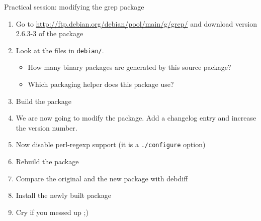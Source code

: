 \documentclass[10pt,final]{beamer}
\begin{document}
\begin{frame}{Practical session: modifying the grep package}
\begin{enumerate}
	\item Go to \url{http://ftp.debian.org/debian/pool/main/g/grep/} and
		download version 2.6.3-3 of the package
	\item Look at the files in \texttt{debian/}.
		\begin{itemize}
			\item 		How many binary packages are generated by this source package?
			\item 		Which packaging helper does this package use?
		\end{itemize}
    \hbr
	\item Build the package
    \hbr
	\item We are now going to modify the package. Add a changelog entry and increase the version number.
    \hbr
	\item Now disable perl-regexp support (it is a \texttt{./configure} option)
    \hbr
	\item Rebuild the package
    \hbr
	\item Compare the original and the new package with debdiff
    \hbr
	\item Install the newly built package
    \hbr
	\item Cry if you messed up ;)
\end{enumerate}
\end{frame}
\end{document}
